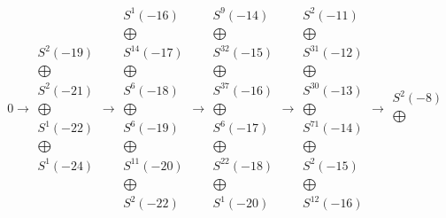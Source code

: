\documentclass[12pt,a3paper,landscape]{amsart}
\numberwithin{equation}{section}
\theoremstyle{plain}
\theoremstyle{definition}
\begin{document}
$$
0 \rightarrow \begin{matrix}
S^{2}(-19)\\ \bigoplus \\
S^{2}(-21)\\ \bigoplus \\
S^{1}(-22)\\ \bigoplus \\
S^{1}(-24)
\end{matrix}
\rightarrow\begin{matrix}
S^{1}(-16)\\ \bigoplus \\
S^{14}(-17)\\ \bigoplus \\
S^{6}(-18)\\ \bigoplus \\
S^{6}(-19)\\ \bigoplus \\
S^{11}(-20)\\ \bigoplus \\
S^{2}(-22)
\end{matrix}
\rightarrow\begin{matrix}
S^{9}(-14)\\ \bigoplus \\
S^{32}(-15)\\ \bigoplus \\
S^{37}(-16)\\ \bigoplus \\
S^{6}(-17)\\ \bigoplus \\
S^{22}(-18)\\ \bigoplus \\
S^{1}(-20)
\end{matrix}
\rightarrow\begin{matrix}
S^{2}(-11)\\ \bigoplus \\
S^{31}(-12)\\ \bigoplus \\
S^{30}(-13)\\ \bigoplus \\
S^{71}(-14)\\ \bigoplus \\
S^{2}(-15)\\ \bigoplus \\
S^{12}(-16)
\end{matrix}
\rightarrow\begin{matrix}
S^{2}(-8)\\ \bigoplus \\

\end{matrix}$$
\end{document}
